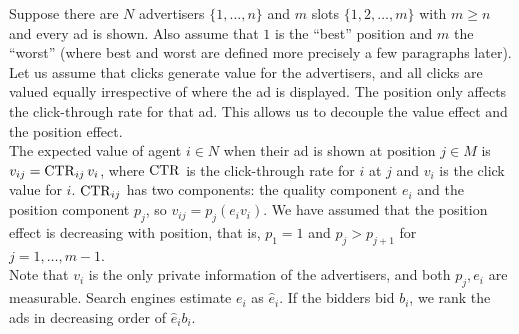 		\begin{fex}
			Suppose there are $N$ advertisers $\{1,\ldots,n\}$ and $m$ slots $\{1,2,\ldots,m\}$ with $m \ge n$ and every ad is shown. Also assume that $1$ is the ``best'' position and $m$ the ``worst'' (where best and worst are defined more precisely a few paragraphs later).\\

			Let us assume that clicks generate value for the advertisers, and all clicks are valued equally irrespective of where the ad is displayed. The position only affects the click-through rate for that ad. This allows us to decouple the value effect and the position effect.\\
			The expected value of agent $i \in N$ when their ad is shown at position $j \in M$ is $v_{ij} = \operatorname{CTR}_{ij} v_i$, where $\operatorname{CTR}$ is the click-through rate for $i$ at $j$ and $v_i$ is the click value for $i$. $\operatorname{CTR}_{ij}$ has two components: the quality component $e_i$ and the position component $p_j$, so $v_{ij} = p_j (e_i v_i)$. We have assumed that the position effect is decreasing with position, that is, $p_1 = 1$ and $p_j > p_{j+1}$ for $j = 1,\ldots,m-1$.\\
			Note that $v_i$ is the only private information of the advertisers, and both $p_j,e_i$ are measurable. Search engines estimate $e_i$ as $\hat{e}_i$. If the bidders bid $b_i$, we rank the ads in decreasing order of $\hat{e}_i b_i$.\\


\end{fex}
